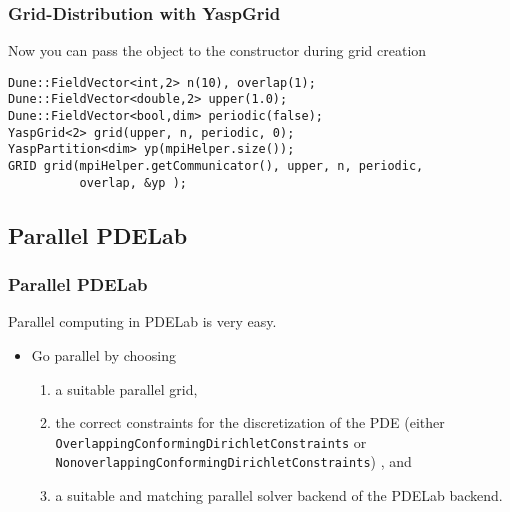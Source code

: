 \begin{frame}[fragile]
  \frametitle<presentation>{Grid-Distribution with YaspGrid}
Now you can pass the object to the constructor during grid creation
\begin{lstlisting}
Dune::FieldVector<int,2> n(10), overlap(1);
Dune::FieldVector<double,2> upper(1.0);
Dune::FieldVector<bool,dim> periodic(false);
YaspGrid<2> grid(upper, n, periodic, 0);
YaspPartition<dim> yp(mpiHelper.size());
GRID grid(mpiHelper.getCommunicator(), upper, n, periodic,
          overlap, &yp );
\end{lstlisting}
\end{frame}

\subsection{Parallel PDELab}

\begin{frame}
  \frametitle<presentation>{Parallel PDELab}
Parallel computing in PDELab is very easy.
  \begin{itemize}
  \item Go parallel by choosing
    \begin{enumerate}
    \item a suitable parallel grid,
    \item the correct constraints for the discretization of
      the PDE (either \lstinline!OverlappingConformingDirichletConstraints! or \lstinline!NonoverlappingConformingDirichletConstraints!) , and
    \item a suitable and matching parallel solver backend of the
      PDELab backend.
    \end{enumerate}
  \end{itemize}
\end{frame}

